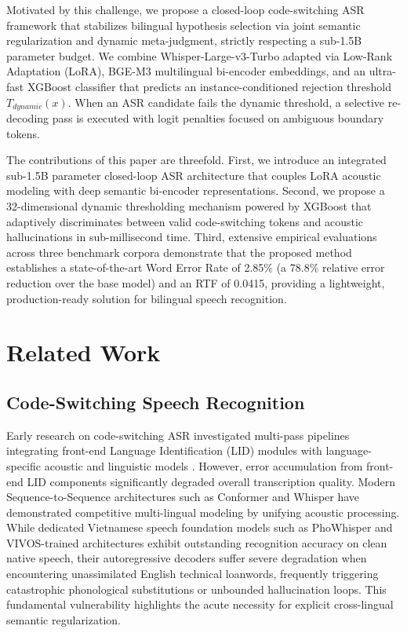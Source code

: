\documentclass[9pt, conference, a4paper, compsocconf]{IEEEtran}
\begin{document}
Motivated by this challenge, we propose a closed-loop code-switching ASR framework that stabilizes bilingual hypothesis selection via joint semantic regularization and dynamic meta-judgment, strictly respecting a sub-1.5B parameter budget. We combine Whisper-Large-v3-Turbo adapted via Low-Rank Adaptation (LoRA), BGE-M3 multilingual bi-encoder embeddings, and an ultra-fast XGBoost classifier that predicts an instance-conditioned rejection threshold $T_{dynamic}(x)$. When an ASR candidate fails the dynamic threshold, a selective re-decoding pass is executed with logit penalties focused on ambiguous boundary tokens.

The contributions of this paper are threefold. First, we introduce an integrated sub-1.5B parameter closed-loop ASR architecture that couples LoRA acoustic modeling with deep semantic bi-encoder representations. Second, we propose a 32-dimensional dynamic thresholding mechanism powered by XGBoost that adaptively discriminates between valid code-switching tokens and acoustic hallucinations in sub-millisecond time. Third, extensive empirical evaluations across three benchmark corpora demonstrate that the proposed method establishes a state-of-the-art Word Error Rate of 2.85\% (a 78.8\% relative error reduction over the base model) and an RTF of 0.0415, providing a lightweight, production-ready solution for bilingual speech recognition.

\section{Related Work}

\subsection{Code-Switching Speech Recognition}
Early research on code-switching ASR investigated multi-pass pipelines integrating front-end Language Identification (LID) modules with language-specific acoustic and linguistic models \cite{sitaram2020survey}. However, error accumulation from front-end LID components significantly degraded overall transcription quality. Modern Sequence-to-Sequence architectures such as Conformer \cite{gulati2020conformer} and Whisper \cite{radford2023whisper} have demonstrated competitive multi-lingual modeling by unifying acoustic processing. While dedicated Vietnamese speech foundation models such as PhoWhisper \cite{nguyen2024phowhisper} and VIVOS-trained architectures \cite{luong2016vivos} exhibit outstanding recognition accuracy on clean native speech, their autoregressive decoders suffer severe degradation when encountering unassimilated English technical loanwords, frequently triggering catastrophic phonological substitutions or unbounded hallucination loops. This fundamental vulnerability highlights the acute necessity for explicit cross-lingual semantic regularization.
\end{document}
